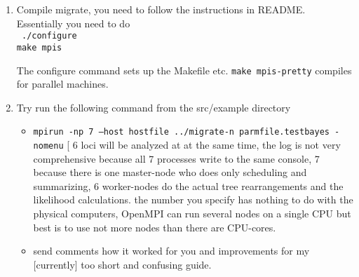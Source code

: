 \begin{enumerate}
    
\item Compile migrate, you need to follow the instructions in README. Essentially you need to do\\
\texttt{
     ./configure\\
     make mpis
     }
     
     The configure command sets up the Makefile etc. 
     \texttt{make mpis-pretty} compiles for parallel machines.
     
\item Try run the following command from the src/example directory
\begin{itemize}
  \item    \texttt{mpirun  -np 7 --host hostfile ../migrate-n parmfile.testbayes -nomenu}
    [ 6 loci will be analyzed at at the same time,
     the log is not very comprehensive because all 7 processes
     write to the same console, 7 because there is one master-node
     who does only scheduling  and summarizing, 6 worker-nodes
     do the actual tree rearrangements and the likelihood calculations.
     the number you specify has nothing to do with the physical computers,
     OpenMPI can run several nodes on a single CPU but best is to use not more nodes than there are CPU-cores.

    \item send comments how it worked for you and improvements for my 
     [currently] too short and confusing guide.
\end{itemize}
\end{enumerate}

